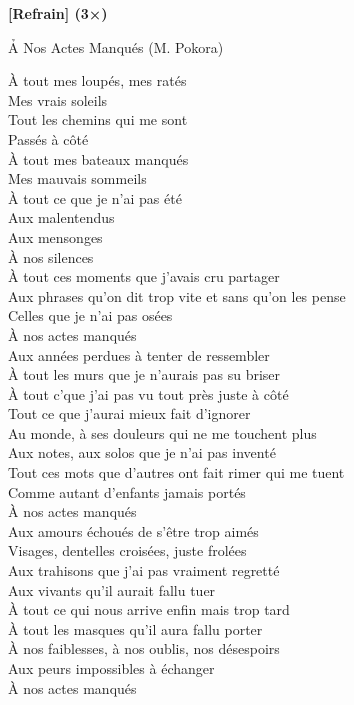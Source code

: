 \documentclass{novel}
\begin{document}
{\begin{minipage}[t][0.5\textheight][t]{\textwidth}
\begin{multicols}{2}
\textbf{[Refrain] (3×)}\\

\end{multicols}
\end{minipage}

\begin{minipage}[t][0.5\textheight][t]{\textwidth}
\vspace{0.00\textheight}
\h*{A Nos Actes Manqués (M. Pokora)}
\begin{multicols}{2}
À tout mes loupés, mes ratés \\
Mes vrais soleils \\
Tout les chemins qui me sont \\
Passés à côté \\
À tout mes bateaux manqués \\
Mes mauvais sommeils \\
À tout ce que je n'ai pas été \\

Aux malentendus \\
Aux mensonges \\
À nos silences \\
À tout ces moments que j'avais cru partager \\
Aux phrases qu'on dit trop vite et sans qu'on les pense \\
Celles que je n'ai pas osées \\
À nos actes manqués \\

Aux années perdues à tenter de ressembler \\
À tout les murs que je n'aurais pas su briser \\
À tout c'que j'ai pas vu tout près juste à côté \\
Tout ce que j'aurai mieux fait d'ignorer \\
Au monde, à ses douleurs qui ne me touchent plus \\
Aux notes, aux solos que je n'ai pas inventé \\
Tout ces mots que d'autres ont fait rimer qui me tuent \\
Comme autant d'enfants jamais portés \\
À nos actes manqués \\

Aux amours échoués de s'être trop aimés \\
Visages, dentelles croisées, juste frolées \\
Aux trahisons que j'ai pas vraiment regretté \\
Aux vivants qu'il aurait fallu tuer \\

À tout ce qui nous arrive enfin mais trop tard \\
À tout les masques qu'il aura fallu porter \\
À nos faiblesses, à nos oublis, nos désespoirs \\
Aux peurs impossibles à échanger \\
À nos actes manqués
\end{multicols}
\end{minipage}

}
\end{document}
